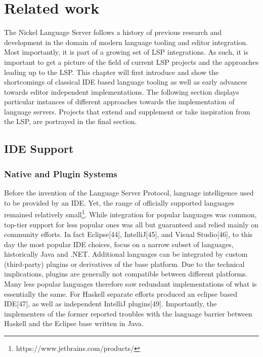 \documentclass[
  a4paper,
  bibtex,
  english,
  nomenclature]{kthlatex/kththesis/kththesis}
\begin{document}
\hypertarget{sec:related-work}{%
\chapter{Related work}\label{sec:related-work}}

The Nickel Language Server follows a history of previous research and
development in the domain of modern language tooling and editor
integration. Most importantly, it is part of a growing set of LSP
integrations. As such, it is important to get a picture of the field of
current LSP projects and the approaches leading up to the LSP. This
chapter will first introduce and show the shortcomings of classical IDE
based language tooling as well as early advances towards editor
independent implementations. The following section displays particular
instances of different approaches towards the implementation of language
servers. Projects that extend and supplement or take inspiration from
the LSP, are portrayed in the final section.

\hypertarget{sec:ide-support}{%
\section{IDE Support}\label{sec:ide-support}}

\hypertarget{sec:native-and-plugin-systems}{%
\subsection{Native and Plugin
Systems}\label{sec:native-and-plugin-systems}}

Before the invention of the Language Server Protocol, language
intelligence used to be provided by an IDE. Yet, the range of officially
supported languages remained relatively small\footnote{https://www.jetbrains.com/products/}.
While integration for popular languages was common, top-tier support for
less popular ones was all but guaranteed and relied mainly on community
efforts. In fact Eclipse{[}44{]}, IntelliJ{[}45{]}, and Visual
Studio{[}46{]}, to this day the most popular IDE choices, focus on a
narrow subset of languages, historically Java and .NET. Additional
languages can be integrated by custom (third-party) plugins or
derivatives of the base platform. Due to the technical implications,
plugins are generally not compatible between different platforms. Many
less popular languages therefore saw redundant implementations of what
is essentially the same. For Haskell separate efforts produced an
eclipse based IDE{[}47{]}, as well as independent IntelliJ
plugins{[}49{]}. Importantly, the implementers of the former reported
troubles with the language barrier between Haskell and the Eclipse base
written in Java.
\end{document}
